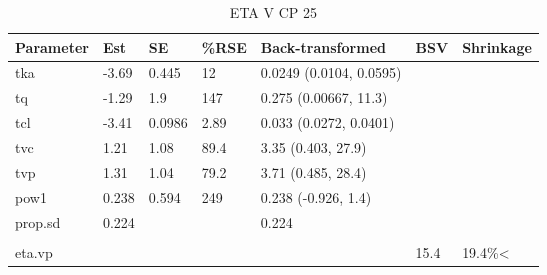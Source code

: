 \begin{table}
\centering\centering
\caption{ETA V CP 25}
\centering
\fontsize{8}{10}\selectfont
\begin{tabular}[t]{lllllll}
\toprule
\textbf{Parameter} & \textbf{Est} & \textbf{SE} & \textbf{\%RSE} & \textbf{Back-transformed} & \textbf{BSV} & \textbf{Shrinkage}\\
\midrule
tka & -3.69 & 0.445 & 12 & 0.0249 (0.0104, 0.0595) &  & \\
\midrule
tq & -1.29 & 1.9 & 147 & 0.275 (0.00667, 11.3) &  & \\
\midrule
tcl & -3.41 & 0.0986 & 2.89 & 0.033 (0.0272, 0.0401) &  & \\
\midrule
tvc & 1.21 & 1.08 & 89.4 & 3.35 (0.403, 27.9) &  & \\
\midrule
tvp & 1.31 & 1.04 & 79.2 & 3.71 (0.485, 28.4) &  & \\
\midrule
pow1 & 0.238 & 0.594 & 249 & 0.238 (-0.926, 1.4) &  & \\
\midrule
prop.sd & 0.224 &  &  & 0.224 &  & \\
\midrule\\
eta.vp &  &  &  &  & 15.4 & 19.4\%<\\
\bottomrule
\end{tabular}
\end{table}